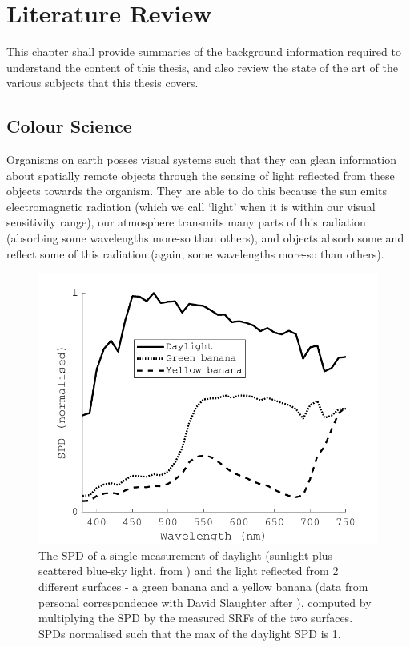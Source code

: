 \chapter{Literature Review}
\label{LitReview}

This chapter shall provide summaries of the background information required to understand the content of this thesis, and also review the state of the art of the various subjects that this thesis covers.

\clearpage



\section{Colour Science}

Organisms on earth posses visual systems such that they can glean information about spatially remote objects through the sensing of light reflected from these objects towards the organism. They are able to do this because the sun emits electromagnetic radiation (which we call `light' when it is within our visual sensitivity range), our atmosphere transmits many parts of this radiation (absorbing some wavelengths more-so than others), and objects absorb some and reflect some of this radiation (again, some wavelengths more-so than others).

\begin{figure}[htbp]
\includegraphics[max width=\textwidth]{figs/LitRev/daylightAndBananas.pdf}
\caption{The \gls{SPD} of a single measurement of daylight (sunlight plus scattered blue-sky light, from \citet{hernandez-andres_color_2001}) and the light reflected from 2 different surfaces - a green banana and a yellow banana (data from personal correspondence with David Slaughter after \citet{li_optical_1997}), computed by multiplying the \gls{SPD} by the measured \glspl{SRF} of the two surfaces. \Glspl{SPD} normalised such that the max of the daylight \gls{SPD} is 1.}
\label{fig:SPD}
\end{figure}

